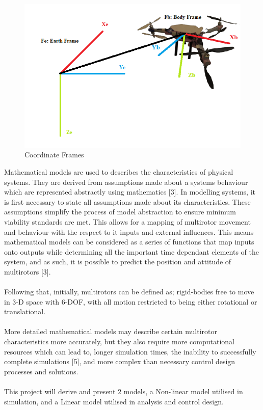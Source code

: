 \documentclass[12pt,a4paper,twoside]{report}
\begin{document}
			\begin{figure}[h!]
				\centering
				\includegraphics[width=0.7\linewidth]{UAVwithFrames.png}
				\caption{Coordinate Frames}
				\label{fig:Coordinate frames}
			\end{figure}
			
			Mathematical models are used to describes the characteristics of physical systems. They are derived from assumptions made about a systems behaviour which are represented abstractly using mathematics [3]. In modelling systems, it is first necessary to state all assumptions made about its characteristics. These assumptions simplify the process of model abstraction to ensure minimum viability standards are met. This allows for a mapping of multirotor movement and behaviour with the respect to it inputs and external influences. This means mathematical models can be considered as a series of functions that map inputs onto outputs while determining all the important time  dependant elements of the system, and as such, it is possible to predict the position and attitude of multirotors [3]. 
			\\ \\
			Following that, initially, multirotors can be defined as; rigid-bodies free to move in 3-D space with 6-DOF, with all motion restricted to being either rotational or translational.
			\\ \\
			More detailed mathematical models may describe certain multirotor characteristics more accurately, but they also require more computational resources which can lead to, longer simulation times, the inability to successfully complete simulations [5], and more complex than necessary control design processes and solutions.
			\\ \\
			This project will derive and present 2 models, a Non-linear model utilised in simulation, and a Linear model utilised in analysis and control design.
			
\end{document}
